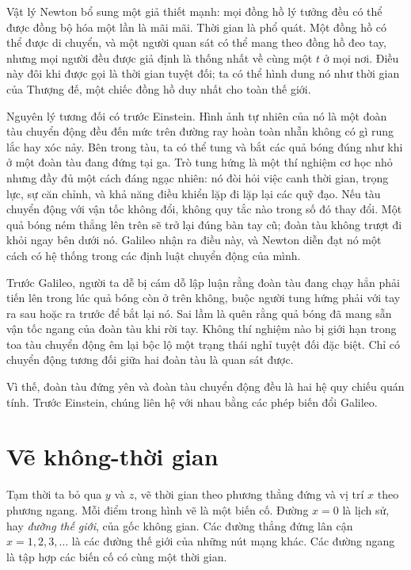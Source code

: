 Vật lý Newton bổ sung một giả thiết mạnh: mọi đồng hồ lý tưởng đều có thể được đồng bộ hóa một lần là mãi mãi. Thời gian là phổ quát. Một đồng hồ có thể được di chuyển, và một người quan sát có thể mang theo đồng hồ đeo tay, nhưng mọi người đều được giả định là thống nhất về cùng một \(t\) ở mọi nơi. Điều này đôi khi được gọi là thời gian tuyệt đối; ta có thể hình dung nó như thời gian của Thượng đế, một chiếc đồng hồ duy nhất cho toàn thế giới.

Nguyên lý tương đối có trước Einstein. Hình ảnh tự nhiên của nó là một đoàn tàu chuyển động đều đến mức trên đường ray hoàn toàn nhẵn không có gì rung lắc hay xóc nảy. Bên trong tàu, ta có thể tung và bắt các quả bóng đúng như khi ở một đoàn tàu đang đứng tại ga. Trò tung hứng là một thí nghiệm cơ học nhỏ nhưng đầy đủ một cách đáng ngạc nhiên: nó đòi hỏi việc canh thời gian, trọng lực, sự căn chỉnh, và khả năng điều khiển lặp đi lặp lại các quỹ đạo. Nếu tàu chuyển động với vận tốc không đổi, không quy tắc nào trong số đó thay đổi. Một quả bóng ném thẳng lên trên sẽ trở lại đúng bàn tay cũ; đoàn tàu không trượt đi khỏi ngay bên dưới nó. Galileo nhận ra điều này, và Newton diễn đạt nó một cách có hệ thống trong các định luật chuyển động của mình.

Trước Galileo, người ta dễ bị cám dỗ lập luận rằng đoàn tàu đang chạy hẳn phải tiến lên trong lúc quả bóng còn ở trên không, buộc người tung hứng phải với tay ra sau hoặc ra trước để bắt lại nó. Sai lầm là quên rằng quả bóng đã mang sẵn vận tốc ngang của đoàn tàu khi rời tay. Không thí nghiệm nào bị giới hạn trong toa tàu chuyển động êm lại bộc lộ một trạng thái nghỉ tuyệt đối đặc biệt. Chỉ có chuyển động tương đối giữa hai đoàn tàu là quan sát được.

Vì thế, đoàn tàu đứng yên và đoàn tàu chuyển động đều là hai hệ quy chiếu quán tính. Trước Einstein, chúng liên hệ với nhau bằng các phép biến đổi Galileo.

\section{Vẽ không-thời gian}

Tạm thời ta bỏ qua \(y\) và \(z\), vẽ thời gian theo phương thẳng đứng và vị trí \(x\) theo phương ngang. Mỗi điểm trong hình vẽ là một biến cố. Đường \(x=0\) là lịch sử, hay \emph{đường thế giới}, của gốc không gian. Các đường thẳng đứng lân cận \(x=1,2,3,\ldots\) là các đường thế giới của những nút mạng khác. Các đường ngang là tập hợp các biến cố có cùng một thời gian.

